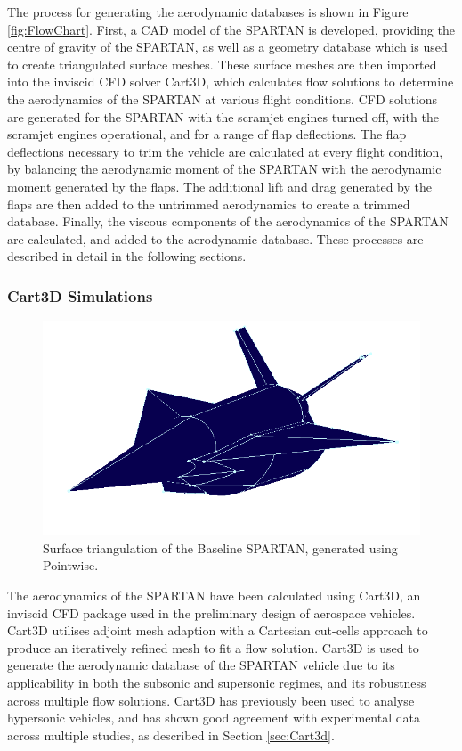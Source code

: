 The process for generating the aerodynamic databases is shown in Figure \ref{fig:FlowChart}. First, a CAD model of the SPARTAN is developed, providing the centre of gravity of the SPARTAN, as well as a geometry database which is used to create triangulated surface meshes. These surface meshes are then imported into the inviscid CFD solver Cart3D\cite{CART3D}, which calculates flow solutions to determine the aerodynamics of the SPARTAN at various flight conditions. CFD solutions are generated for the SPARTAN with the scramjet engines turned off, with the scramjet engines operational, and for a range of flap deflections. 
The flap deflections necessary to trim the vehicle are calculated at every flight condition, by balancing the aerodynamic moment of the SPARTAN with the aerodynamic moment generated by the flaps. 
The additional lift and drag generated by the flaps are then added to the untrimmed aerodynamics to create a trimmed database.
Finally, the viscous components of the aerodynamics of the SPARTAN are calculated, and added to the aerodynamic database. These processes are described in detail in the following sections. 







\subsubsection{Cart3D Simulations}\label{sec:cart3d}
\begin{figure}[ht]
	\centering
	\includegraphics[width=0.6\linewidth]{figures/3_vehicle_design/Pointwise}
	\caption{Surface triangulation of the Baseline SPARTAN, generated using Pointwise\cite{Pointwise}.}
	\label{fig:Pointwise}
\end{figure}

The aerodynamics of the SPARTAN have been calculated using Cart3D, an inviscid CFD package used in the preliminary design of aerospace vehicles. Cart3D utilises adjoint mesh adaption with a Cartesian cut-cells approach to produce an iteratively refined mesh to fit a flow solution. Cart3D is used to generate the aerodynamic database of the SPARTAN vehicle due to its applicability in both the subsonic
and supersonic regimes, and its robustness across multiple flow solutions\cite{Sagerman2017,Abeynayake,Aftosmis2011,Almosnino2016a,Gomez2004}. Cart3D has previously been used to
analyse hypersonic vehicles, and has shown good agreement with experimental data across multiple studies\cite{Sagerman2017,Abeynayake,Aftosmis2011,Almosnino2016a}, as described in Section \ref{sec:Cart3d}.


